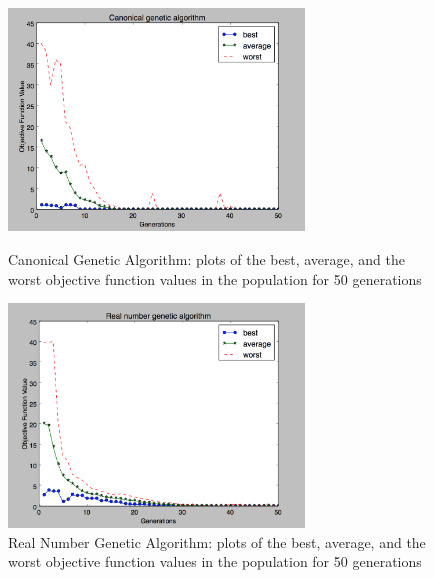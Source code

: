 \documentclass{article}
\begin{document}
\begin{figure}
\includegraphics[width=0.7\textwidth]{Canonical_GA_best_plot}
\centering
\caption{Canonical Genetic Algorithm: plots of the best, average, and the worst objective function values in the population for 50 generations}


\includegraphics[width=0.7\textwidth]{Real_number_GA}
\centering
\caption{Real Number Genetic Algorithm: plots of the best, average, and the worst objective function values in the population for 50 generations}



\end{figure}
\end{document}
